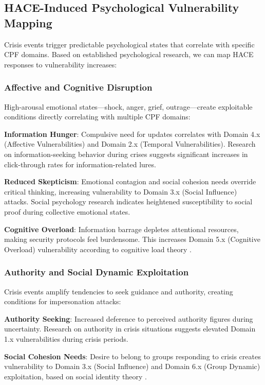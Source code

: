 \documentclass[11pt,a4paper]{article}
\begin{document}
\subsection{HACE-Induced Psychological Vulnerability Mapping}

Crisis events trigger predictable psychological states that correlate with specific CPF domains. Based on established psychological research, we can map HACE responses to vulnerability increases:

\subsubsection{Affective and Cognitive Disruption}

High-arousal emotional states—shock, anger, grief, outrage—create exploitable conditions directly correlating with multiple CPF domains:

\textbf{Information Hunger}: Compulsive need for updates correlates with Domain 4.x (Affective Vulnerabilities) and Domain 2.x (Temporal Vulnerabilities). Research on information-seeking behavior during crises \cite{spence2005} suggests significant increases in click-through rates for information-related lures.

\textbf{Reduced Skepticism}: Emotional contagion and social cohesion needs override critical thinking, increasing vulnerability to Domain 3.x (Social Influence) attacks. Social psychology research \cite{hatfield1994} indicates heightened susceptibility to social proof during collective emotional states.

\textbf{Cognitive Overload}: Information barrage depletes attentional resources, making security protocols feel burdensome. This increases Domain 5.x (Cognitive Overload) vulnerability according to cognitive load theory \cite{sweller1988}.

\subsubsection{Authority and Social Dynamic Exploitation}

Crisis events amplify tendencies to seek guidance and authority, creating conditions for impersonation attacks:

\textbf{Authority Seeking}: Increased deference to perceived authority figures during uncertainty. Research on authority in crisis situations \cite{fritz1961} suggests elevated Domain 1.x vulnerabilities during crisis periods.

\textbf{Social Cohesion Needs}: Desire to belong to groups responding to crisis creates vulnerability to Domain 3.x (Social Influence) and Domain 6.x (Group Dynamic) exploitation, based on social identity theory \cite{tajfel1979}.
\end{document}
